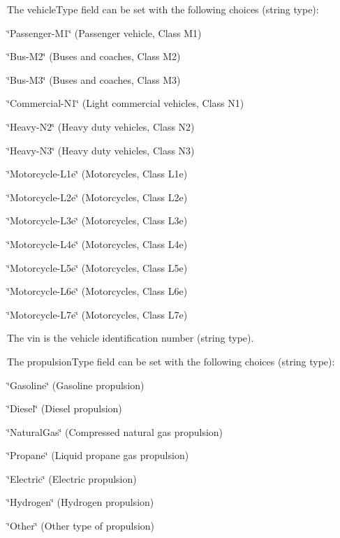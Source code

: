 The \textquotesingle{}vehicle\+Type\textquotesingle{} field can be set with the following choices (string type)\+:
\begin{DoxyItemize}
\item \char`\"{}\+Passenger-\/\+M1\char`\"{} (Passenger vehicle, Class M1)
\item \char`\"{}\+Bus-\/\+M2\char`\"{} (Buses and coaches, Class M2)
\item \char`\"{}\+Bus-\/\+M3\char`\"{} (Buses and coaches, Class M3)
\item \char`\"{}\+Commercial-\/\+N1\char`\"{} (Light commercial vehicles, Class N1)
\item \char`\"{}\+Heavy-\/\+N2\char`\"{} (Heavy duty vehicles, Class N2)
\item \char`\"{}\+Heavy-\/\+N3\char`\"{} (Heavy duty vehicles, Class N3)
\item \char`\"{}\+Motorcycle-\/\+L1e\char`\"{} (Motorcycles, Class L1e)
\item \char`\"{}\+Motorcycle-\/\+L2e\char`\"{} (Motorcycles, Class L2e)
\item \char`\"{}\+Motorcycle-\/\+L3e\char`\"{} (Motorcycles, Class L3e)
\item \char`\"{}\+Motorcycle-\/\+L4e\char`\"{} (Motorcycles, Class L4e)
\item \char`\"{}\+Motorcycle-\/\+L5e\char`\"{} (Motorcycles, Class L5e)
\item \char`\"{}\+Motorcycle-\/\+L6e\char`\"{} (Motorcycles, Class L6e)
\item \char`\"{}\+Motorcycle-\/\+L7e\char`\"{} (Motorcycles, Class L7e)
\end{DoxyItemize}

The \textquotesingle{}vin\textquotesingle{} is the vehicle identification number (string type).

The \textquotesingle{}propulsion\+Type\textquotesingle{} field can be set with the following choices (string type)\+:
\begin{DoxyItemize}
\item \char`\"{}\+Gasoline\char`\"{} (Gasoline propulsion)
\item \char`\"{}\+Diesel\char`\"{} (Diesel propulsion)
\item \char`\"{}\+Natural\+Gas\char`\"{} (Compressed natural gas propulsion)
\item \char`\"{}\+Propane\char`\"{} (Liquid propane gas propulsion)
\item \char`\"{}\+Electric\char`\"{} (Electric propulsion)
\item \char`\"{}\+Hydrogen\char`\"{} (Hydrogen propulsion)
\item \char`\"{}\+Other\char`\"{} (Other type of propulsion)
\end{DoxyItemize}

